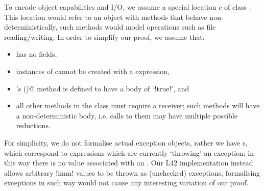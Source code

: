 \noindent To encode object capabilities and I/O, we assume a special location  $c$ of class \Q@Cap@. This location would refer to an object with methods that behave non-deterministically, such methods would model operations such as file reading/writing. In order to simplify our proof, we assume that:
\begin{itemize}
	\item \Q@Cap@ has no fields,
	\item instances of \Q@Cap@ cannot be created with a \Q@new@ expression,
	\item \Q@Cap@'s \Q@invariant()@ method is defined to have a body of `\Q!true!', and
	\item all other methods in the \Q@Cap@ class must require a \Q@mut@ receiver; such methods will have a non-deterministic body, i.e. calls to them may have multiple possible reductions.
\end{itemize}
For simplicity, we do not formalise actual exception objects, rather we have \error{}s, which correspond to expressions which are currently  `throwing' an exception; 
in this way there is no value associated with an \error.
Our L42 implementation instead allows arbitrary \Q!imm! values to be thrown as (unchecked) exceptions, formalising exceptions in such way would not cause any interesting variation of our proof.

